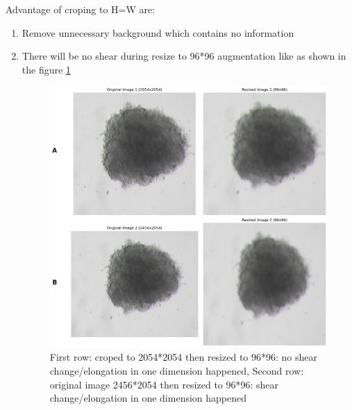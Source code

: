 \begin{enumerate}
    Advantage of croping to H=W are:
    \begin{enumerate}
      \item  Remove unnecessary background which contains no information
      \item  There will be no shear during resize to 96*96 augmentation like as shown in the figure \ref{fig:elong}
      \begin{figure}[H]
        \centering
        \includegraphics[scale=0.46]{figures/long.png} 
        \caption{First row: croped to 2054*2054 then resized to 96*96: no shear change/elongation in one dimension happened, Second row: 
       original image 2456*2054 then resized to 96*96: shear change/elongation in one dimension happened}
        \label{fig:elong}
      \end{figure}
      

\end{enumerate}
\end{enumerate}
